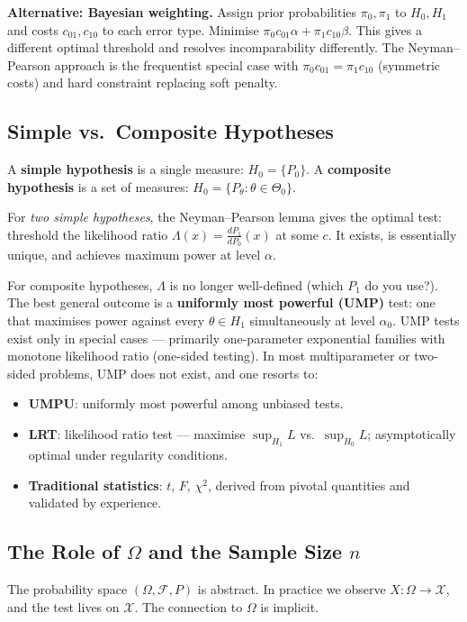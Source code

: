 \documentclass[11pt, a4paper]{article}
\begin{document}
\textbf{Alternative: Bayesian weighting.}
Assign prior probabilities $\pi_0, \pi_1$ to $H_0, H_1$ and costs $c_{01}, c_{10}$
to each error type. Minimise $\pi_0 c_{01}\alpha + \pi_1 c_{10}\beta$.
This gives a different optimal threshold and resolves incomparability differently.
The Neyman--Pearson approach is the frequentist special case with $\pi_0 c_{01} = \pi_1 c_{10}$
(symmetric costs) and hard constraint replacing soft penalty.

\subsection{Simple vs.\ Composite Hypotheses}

A \textbf{simple hypothesis} is a single measure: $H_0 = \{P_0\}$.
A \textbf{composite hypothesis} is a set of measures: $H_0 = \{P_\theta: \theta\in\Theta_0\}$.

For \emph{two simple hypotheses}, the Neyman--Pearson lemma gives the optimal test:
threshold the likelihood ratio $\Lambda(x) = \frac{dP_1}{dP_0}(x)$ at some $c$.
It exists, is essentially unique, and achieves maximum power at level $\alpha$.

For composite hypotheses, $\Lambda$ is no longer well-defined (which $P_1$ do you use?).
The best general outcome is a \textbf{uniformly most powerful (UMP)} test: one that
maximises power against every $\theta\in H_1$ simultaneously at level $\alpha_0$.
UMP tests exist only in special cases --- primarily one-parameter exponential families
with monotone likelihood ratio (one-sided testing). In most multiparameter or two-sided
problems, UMP does not exist, and one resorts to:
\begin{itemize}
  \item \textbf{UMPU}: uniformly most powerful among unbiased tests.
  \item \textbf{LRT}: likelihood ratio test --- maximise $\sup_{H_1} L$ vs.\
        $\sup_{H_0} L$; asymptotically optimal under regularity conditions.
  \item \textbf{Traditional statistics}: $t$, $F$, $\chi^2$, derived from pivotal
        quantities and validated by experience.
\end{itemize}

\subsection{The Role of $\Omega$ and the Sample Size $n$}

The probability space $(\Omega,\mathcal{F},P)$ is abstract. In practice we observe
$X:\Omega\to\mathcal{X}$, and the test lives on $\mathcal{X}$.
The connection to $\Omega$ is implicit.
\end{document}
